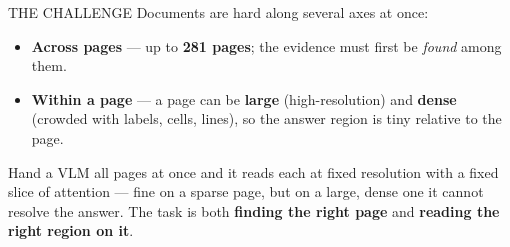 \documentclass{article}
\newcommand{\keyval}[1]{\textcolor{pteal}{\bfseries #1}}
\begin{document}
\begin{minipage}[t]{0.655\textwidth}
\begin{minipage}[t]{0.485\linewidth}
\begin{panel}{THE CHALLENGE}
Documents are hard along several axes at once:
\begin{itemize}
  \item \keyval{Across pages} --- up to \keyval{281 pages}; the evidence must first
  be \emph{found} among them.
  \item \keyval{Within a page} --- a page can be \keyval{large} (high-resolution)
  and \keyval{dense} (crowded with labels, cells, lines), so the answer region is
  tiny relative to the page.
\end{itemize}
\vspace{3pt}
Hand a VLM all pages at once and it reads each at fixed resolution with a fixed
slice of attention --- fine on a sparse page, but on a large, dense one it cannot
resolve the answer. The task is both \keyval{finding the right page} and
\keyval{reading the right region on it}.
\end{panel}


\end{minipage}
\end{minipage}
\end{document}
